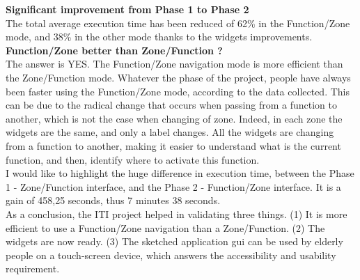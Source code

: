 {\bf Significant improvement from Phase 1 to Phase 2}\\
The total average execution time has been reduced of 62\% in the Function/Zone mode, and 38\% in the other mode 	thanks to the widgets improvements.\\

{\bf Function/Zone better than Zone/Function ?}\\
The answer is YES. The Function/Zone navigation mode is more efficient than the Zone/Function mode. Whatever the phase of the project, people have always been faster using the Function/Zone mode, according to the data collected. This can be due to the radical change that occurs when passing from a function to another, which is not the case when changing of zone. Indeed, in each zone the widgets are the same, and only a label changes. All the widgets are changing from a function to another, making it easier to understand what is the current function, and then, identify where to activate this function.\\

I would like to highlight the huge difference in execution time, between the Phase 1 - Zone/Function interface, and the Phase 2 - Function/Zone interface. It is a gain of 458,25 seconds, thus 7 minutes 38 seconds.\\
As a conclusion, the ITI project helped in validating three things. (1) It is more efficient to use a Function/Zone navigation than a Zone/Function. (2) The widgets are now ready. (3) The sketched application \gls{gui} can be used by elderly people on a touch-screen device, which answers the accessibility and usability requirement.

